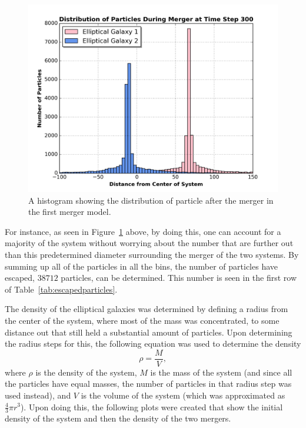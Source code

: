 \documentclass[12pt]{report}
\begin{document}
\begin{figure}[h]
    \centering
    \includegraphics[width=\linewidth]{histogram_final_distributionofparticlesfromcenter_aftermerger.png}
    \caption{A histogram showing the distribution of particle after the merger in the first merger model.}
    \label{fig:histdist_merger1}
\end{figure}

For instance, as seen in Figure~\ref{fig:histdist_merger1} above, by doing this, one can account for a majority of the system without worrying about the number that are further out than this predetermined diameter surrounding the merger of the two systems. By summing up all of the particles in all the bins, the number of particles have escaped, $38712$ particles, can be determined. This number is seen in the first row of Table~\ref{tab:escapedparticles}.

The density of the elliptical galaxies was determined by defining a radius from the center of the system, where most of the mass was concentrated, to some distance out that still held a substantial amount of particles. Upon determining the radius steps for this, the following equation was used to determine the density
\begin{equation}\label{eqn:density_eqn}
    \rho = \frac{M}{V},
\end{equation}
where $\rho$ is the density of the system, $M$ is the mass of the system (and since all the particles have equal masses, the number of particles in that radius step was used instead), and $V$ is the volume of the system (which was approximated as $\frac{4}{3}\pi r^3$). Upon doing this, the following plots were created that show the initial density of the system and then the density of the two mergers.
\end{document}
